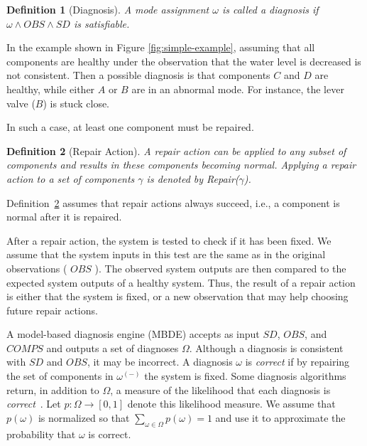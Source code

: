 \documentclass[review]{elsarticle}
\newtheorem{definition}{Definition}
\newcommand{\COMPS}{\textit{COMPS}}
\newcommand{\SD}{\textit{SD}}
\newcommand{\OBS}{\textit{OBS}}
\begin{document}
\begin{definition}[Diagnosis]
A mode assignment $\omega$ is called a diagnosis if $\omega \wedge \OBS \wedge \SD$ is satisfiable.
\end{definition}

In the example shown in Figure \ref{fig:simple-example}, assuming that all components are healthy under the observation that the water level is decreased is not consistent. Then a possible diagnosis is that components $C$ and $D$ are healthy, while either $A$ or $B$ are in an abnormal mode. For instance, the lever valve ($B$) is stuck close.

\noindent In such a case, at least one component must be repaired.

\begin{definition}[Repair Action]
A repair action can be applied to any subset of components and results in these components becoming normal. Applying a repair action to a set of components $\gamma$ is denoted by Repair($\gamma$).
\label{def:repairAction}
\end{definition}
Definition~\ref{def:repairAction} assumes that repair actions always succeed, i.e., a component is normal after it is repaired. %

After a repair action, the system is tested to check if it has been fixed.
We assume that the system inputs in this test are the same as in the original observations ( $\OBS$ ). The observed system outputs are then compared to the expected system outputs of a healthy system. Thus, the result of a repair action is either that the system is fixed, or a new observation that may help choosing future repair actions.




A model-based diagnosis engine (MBDE) accepts as input $\SD$, $\OBS$, and $\COMPS$ and outputs a set of diagnoses $\Omega$. Although a diagnosis is consistent with $\SD$ and $\OBS$, it may be incorrect. A diagnosis $\omega$ is {\em correct} if by repairing the set of components in $\omega^{(-)}$ the system is fixed. Some diagnosis algorithms return, in addition to $\Omega$, a measure of the likelihood that each diagnosis is {\em correct}~\cite{williams2007conflict,abreu2011simultaneousDebugging}. Let $p: \Omega \rightarrow [0,1]$ denote this likelihood measure. We assume that $p(\omega)$ is normalized so that $\sum_{\omega\in\Omega} p(\omega)=1$ and use it to approximate the probability that $\omega$ is correct.
\end{document}
